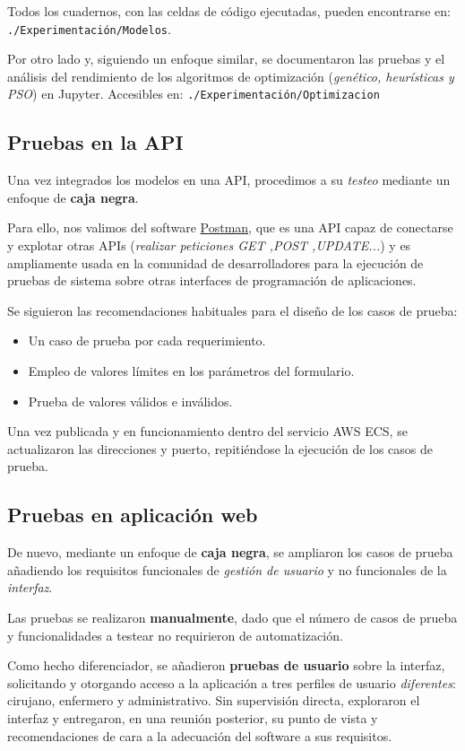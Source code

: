 Todos los cuadernos, con las celdas de código ejecutadas, pueden encontrarse en: \texttt{./Experimentación/Modelos}.

Por otro lado y, siguiendo un enfoque similar, se documentaron las pruebas y el análisis del rendimiento de los algoritmos de optimización (\textit{genético, heurísticas y PSO}) en Jupyter. Accesibles en: 
\texttt{./Experimentación/Optimizacion}

\subsection{Pruebas en la API}

Una vez integrados los modelos en una API, procedimos a su \textit{testeo} mediante un enfoque de \textbf{caja negra}.

Para ello, nos valimos del software \href{https://www.postman.com/}{Postman}, que es una API capaz de conectarse y explotar otras APIs (\textit{realizar peticiones GET ,POST ,UPDATE...}) y es ampliamente usada en la comunidad de desarrolladores para la ejecución de pruebas de sistema sobre otras interfaces de programación de aplicaciones.

Se siguieron las recomendaciones habituales para el diseño de los casos de prueba:

\begin{itemize}
    \item Un caso de prueba por cada requerimiento.
    \item Empleo de valores límites en los parámetros del formulario.
    \item Prueba de valores válidos e inválidos.
\end{itemize}


Una vez publicada y en funcionamiento dentro del servicio AWS ECS, se actualizaron las direcciones y puerto, repitiéndose la ejecución de los casos de prueba.

\subsection{Pruebas en aplicación web}

De nuevo, mediante un enfoque de \textbf{caja negra}, se ampliaron los casos de prueba añadiendo los requisitos funcionales de \textit{gestión de usuario} y no funcionales de la \textit{interfaz}.

Las pruebas se realizaron \textbf{manualmente}, dado que el número de casos de prueba y funcionalidades a testear no requirieron de automatización.

Como hecho diferenciador, se añadieron \textbf{pruebas de usuario} sobre la interfaz, solicitando y otorgando acceso a la aplicación a tres perfiles de usuario \textit{diferentes}: cirujano, enfermero y administrativo.
Sin supervisión directa, exploraron el interfaz y entregaron, en una reunión posterior, su punto de vista y recomendaciones de cara a la adecuación del software a sus requisitos.

